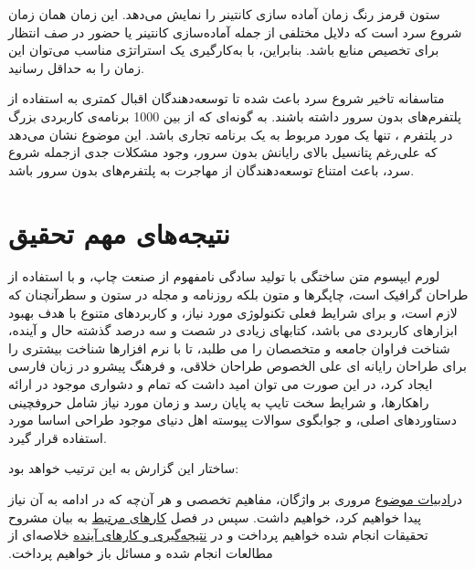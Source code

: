 \par
ستون قرمز رنگ زمان آماده سازی کانتینر را نمایش می‌دهد. این زمان همان زمان شروع سرد است که دلایل مختلفی از جمله آماده‌سازی کانتینر یا حضور در صف انتظار برای تخصیص منابع باشد. بنابراین، با به‌کارگیری یک استراتژی مناسب می‌توان این زمان را به حداقل رسانید. 

\par 
متاسفانه تاخیر شروع سرد باعث شده تا توسعه‌دهندگان اقبال کمتری به استفاده از پلتفرم‌های بدون سرور داشته باشند. به گونه‌ای که از بین 1000 برنامه‌ی کاربردی بزرگ در پلتفرم ، تنها یک مورد مربوط به یک برنامه تجاری باشد\cite{shahrad2020serverless}. این موضوع  نشان می‌دهد که علی‌رغم پتانسیل بالای رایانش بدون سرور، وجود مشکلات جدی ازجمله شروع سرد، باعث امتناع توسعه‌دهندگان از مهاجرت به پلتفرم‌های بدون سرور باشد. 

\par 
\section{نتیجه‌های مهم تحقیق}
لورم ایپسوم متن ساختگی با تولید سادگی نامفهوم از صنعت چاپ، و با استفاده از طراحان گرافیک است، چاپگرها و متون بلکه روزنامه و مجله در ستون و سطرآنچنان که لازم است، و برای شرایط فعلی تکنولوژی مورد نیاز، و کاربردهای متنوع با هدف بهبود ابزارهای کاربردی می باشد، کتابهای زیادی در شصت و سه درصد گذشته حال و آینده، شناخت فراوان جامعه و متخصصان را می طلبد، تا با نرم افزارها شناخت بیشتری را برای طراحان رایانه ای علی الخصوص طراحان خلاقی، و فرهنگ پیشرو در زبان فارسی ایجاد کرد، در این صورت می توان امید داشت که تمام و دشواری موجود در ارائه راهکارها، و شرایط سخت تایپ به پایان رسد و زمان مورد نیاز شامل حروفچینی دستاوردهای اصلی، و جوابگوی سوالات پیوسته اهل دنیای موجود طراحی اساسا مورد استفاده قرار گیرد.

\par
\par
ساختار این گزارش به این ترتیب خواهد بود:‌

‫در\hyperref[literature] {ادبیات موضوع} مروری بر واژگان، مفاهیم تخصصی و هر آن‌چه که در ادامه به آن نیاز پیدا خواهیم کرد، خواهیم داشت. سپس در فصل
\hyperref[related-works]{کار‌های مرتبط}
  به بیان مشروح تحقیقات انجام شده خواهیم پرداخت و در  
\hyperref[conclusion]{نتیجه‌گیری و کار‌های آینده}
  خلاصه‌ای از مطالعات انجام شده و مسائل باز خواهیم پرداخت. ‬